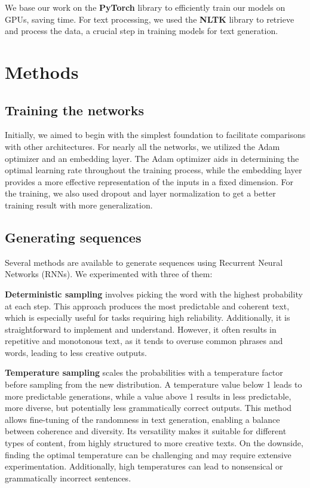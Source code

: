 \documentclass{article}
\begin{document}
We base our work on the \textbf{PyTorch} library to efficiently train our models on GPUs, saving time. For text processing, we used the \textbf{NLTK} library to retrieve and process the data, a crucial step in training models for text generation.

\section{Methods}

\subsection{Training the networks}

Initially, we aimed to begin with the simplest foundation to facilitate comparisons with other architectures. For nearly all the networks, we utilized the Adam optimizer and an embedding layer. The Adam optimizer aids in determining the optimal learning rate throughout the training process, while the embedding layer provides a more effective representation of the inputs in a fixed dimension.
For the training, we also used dropout and layer normalization to get a better training result with more generalization.

\subsection{Generating sequences} 

Several methods are available to generate sequences using Recurrent Neural Networks (RNNs). We experimented with three of them:

\textbf{Deterministic sampling} involves picking the word with the highest probability at each step. This approach produces the most predictable and coherent text, which is especially useful for tasks requiring high reliability. Additionally, it is straightforward to implement and understand. However, it often results in repetitive and monotonous text, as it tends to overuse common phrases and words, leading to less creative outputs.

\textbf{Temperature sampling} scales the probabilities with a temperature factor before sampling from the new distribution. A temperature value below 1 leads to more predictable generations, while a value above 1 results in less predictable, more diverse, but potentially less grammatically correct outputs. This method allows fine-tuning of the randomness in text generation, enabling a balance between coherence and diversity. Its versatility makes it suitable for different types of content, from highly structured to more creative texts. On the downside, finding the optimal temperature can be challenging and may require extensive experimentation. Additionally, high temperatures can lead to nonsensical or grammatically incorrect sentences.
\end{document}
